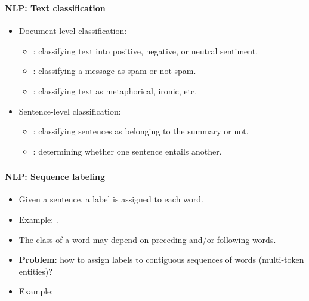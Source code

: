 \documentclass[xcolor=table]{beamer}
\begin{document}
\begin{frame}
	\frametitle{\inserttitle}
	\framesubtitle{NLP: Text classification}
	
	\begin{itemize}
		\item Document-level classification:
		\begin{itemize}
			\item {}: classifying text into positive, negative, or neutral sentiment.
			\item {}: classifying a message as spam or not spam.
			\item {}: classifying text as metaphorical, ironic, etc.
		\end{itemize}
		
		\item Sentence-level classification:
		\begin{itemize}
			\item {}: classifying sentences as belonging to the summary or not.
			\item {}: determining whether one sentence entails another.
		\end{itemize}
	\end{itemize}
	
\end{frame}


\begin{frame}
	\frametitle{\inserttitle}
	\framesubtitle{NLP: Sequence labeling}
	
	\begin{itemize}
		\item Given a sentence, a label is assigned to each word.
		
		\item Example: .
		
		\item The class of a word may depend on preceding and/or following words.
		
		\item \textbf{Problem}: how to assign labels to contiguous sequences of words (multi-token entities)?
		
		\item Example: 
	\end{itemize}
	
\end{frame}
\end{document}
